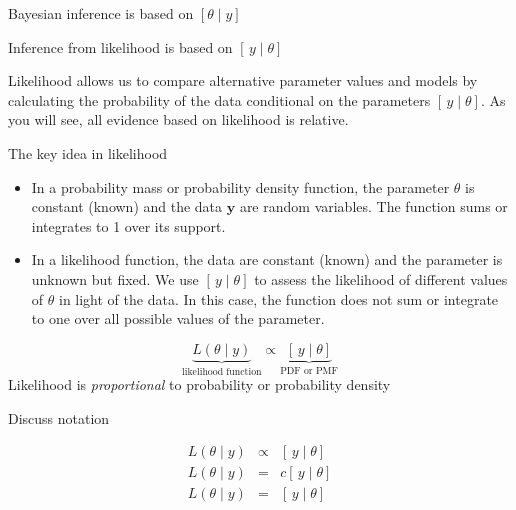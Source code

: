 \documentclass[ignorenonframetext,]{beamer}
\providecommand{\tightlist}{%
  \setlength{\itemsep}{0pt}\setlength{\parskip}{0pt}}
\begin{document}
\begin{frame}{Bayesian inference is based on \([\theta \mid y]\)}

\begin{center}

\end{center}

\end{frame}

\begin{frame}{Inference from likelihood is based on
\([\, y \mid \theta]\)}

\begin{center}

\end{center}

Likelihood allows us to compare alternative parameter values and models
by calculating the probability of the data conditional on the parameters
\([\, y \mid \theta]\). As you will see, all evidence based on
likelihood is relative.

\end{frame}

\begin{frame}{The key idea in likelihood}

\begin{itemize}
\tightlist
\item
  In a probability mass or probability density function, the parameter
  \(\theta\) is constant (known) and the data \(\bm{y}\) are random
  variables. The function sums or integrates to 1 over its support.
\item
  In a likelihood function, the data are constant (known) and the
  parameter is unknown but fixed. We use \([\, y \mid \theta]\) to
  assess the likelihood of different values of \(\theta\) in light of
  the data. In this case, the function does not sum or integrate to one
  over all possible values of the parameter.
\end{itemize}

\[
\underbrace{L\left({\theta \mid y}\right)}_{{\text{likelihood function}}} \propto \underbrace{[\, y \mid \theta]}_{\text{PDF or PMF}}
\] \center Likelihood is \emph{proportional} to probability or
probability density

\end{frame}

\begin{frame}{Discuss notation}

\begin{eqnarray}
L(\theta \mid y) & \propto & [\, y \mid \theta]\\
L(\theta \mid y) & = & c[\, y \mid \theta]\\
L(\theta \mid y) & = & [\, y \mid \theta]
\end{eqnarray}

\end{frame}
\end{document}
